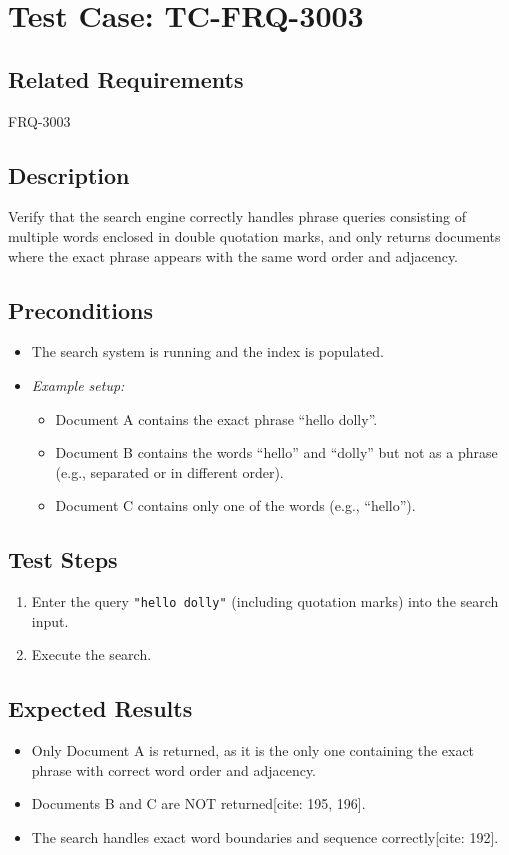\documentclass{article}
\begin{document}
\section{Test Case: TC-FRQ-3003}

\subsection*{Related Requirements}
FRQ-3003

\subsection*{Description}
Verify that the search engine correctly handles phrase queries consisting of multiple words enclosed in double quotation marks, and only returns documents where the exact phrase appears with the same word order and adjacency.

\subsection*{Preconditions}
\begin{itemize}
    \item The search system is running and the index is populated.
    \item[] \textit{Example setup:}
    \begin{itemize}
        \item Document A contains the exact phrase ``hello dolly''.
        \item Document B contains the words ``hello'' and ``dolly'' but not as a phrase (e.g., separated or in different order).
        \item Document C contains only one of the words (e.g., ``hello'').
    \end{itemize}
\end{itemize}

\subsection*{Test Steps}
\begin{enumerate}
    \item Enter the query \texttt{"hello dolly"} (including quotation marks) into the search input.
    \item Execute the search.
\end{enumerate}

\subsection*{Expected Results}
\begin{itemize}
    \item Only Document A is returned, as it is the only one containing the exact phrase with correct word order and adjacency.
    \item Documents B and C are NOT returned[cite: 195, 196].
    \item The search handles exact word boundaries and sequence correctly[cite: 192].
\end{itemize}
\end{document}
